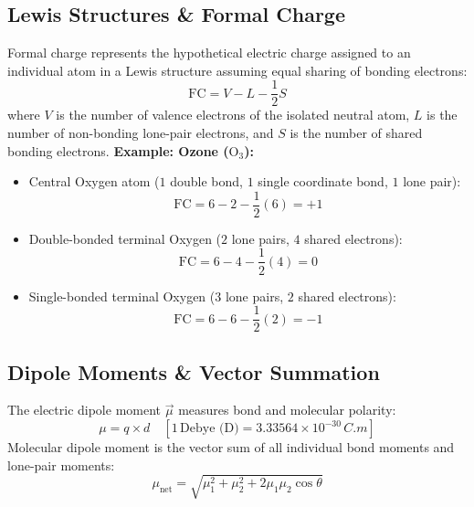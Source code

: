 \documentclass[10pt,a4paper]{article}
\begin{document}
\subsection{Lewis Structures \& Formal Charge}
\begin{formulabox}
Formal charge represents the hypothetical electric charge assigned to an individual atom in a Lewis structure assuming equal sharing of bonding electrons:
\begin{equation}
  \text{FC} = V - L - \frac{1}{2}S
\end{equation}
where $V$ is the number of valence electrons of the isolated neutral atom, $L$ is the number of non-bonding lone-pair electrons, and $S$ is the number of shared bonding electrons.
\textbf{Example: Ozone ($\mathrm{O_3}$):}
\begin{itemize}
  \item Central Oxygen atom ($1$ double bond, $1$ single coordinate bond, $1$ lone pair):
  \begin{equation}
    \text{FC} = 6 - 2 - \frac{1}{2}(6) = +1
  \end{equation}
  \item Double-bonded terminal Oxygen ($2$ lone pairs, $4$ shared electrons):
  \begin{equation}
    \text{FC} = 6 - 4 - \frac{1}{2}(4) = 0
  \end{equation}
  \item Single-bonded terminal Oxygen ($3$ lone pairs, $2$ shared electrons):
  \begin{equation}
    \text{FC} = 6 - 6 - \frac{1}{2}(2) = -1
  \end{equation}
\end{itemize}
\end{formulabox}

\subsection{Dipole Moments \& Vector Summation}
The electric dipole moment $\vec{\mu}$ measures bond and molecular polarity:
\begin{equation}
  \mu = q \times d \quad [1\,\text{Debye (D)} = 3.33564 \times 10^{-30}\,\si{C.m}]
\end{equation}
Molecular dipole moment is the vector sum of all individual bond moments and lone-pair moments:
\begin{equation}
  \mu_{\text{net}} = \sqrt{\mu_1^2 + \mu_2^2 + 2\mu_1\mu_2\cos\theta}
\end{equation}
\end{document}

